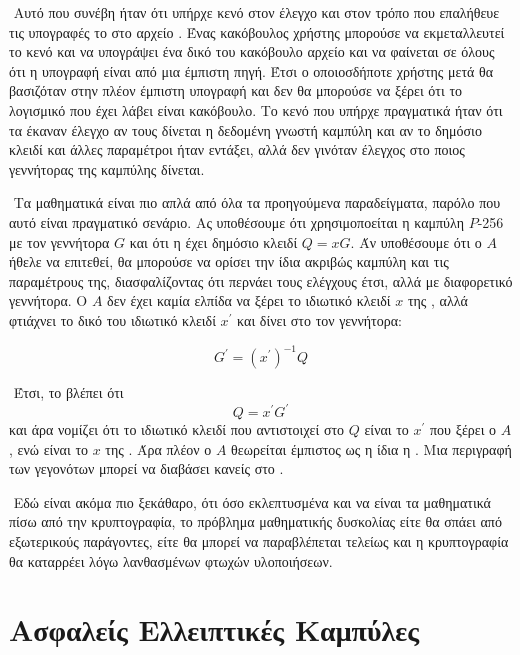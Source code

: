 \documentclass[oneside,a4paper]{article}
\begin{document}
$ $\newline
Αυτό που συνέβη ήταν ότι υπήρχε κενό στον έλεγχο και στον τρόπο που επαλήθευε τις  υπογραφές το  στο αρχείο . Ένας κακόβουλος χρήστης μπορούσε να εκμεταλλευτεί το κενό και να υπογράψει ένα δικό του κακόβουλο αρχείο και να φαίνεται σε όλους ότι η υπογραφή είναι από μια έμπιστη πηγή. Έτσι ο οποιοσδήποτε χρήστης μετά θα βασιζόταν στην πλέον έμπιστη υπογραφή και δεν θα μπορούσε να ξέρει ότι το λογισμικό που έχει λάβει είναι κακόβουλο. Το κενό που υπήρχε πραγματικά ήταν ότι τα  έκαναν έλεγχο αν τους δίνεται η δεδομένη γνωστή καμπύλη και αν το δημόσιο κλειδί και άλλες παραμέτροι ήταν εντάξει, αλλά δεν γινόταν έλεγχος στο ποιος γεννήτορας της καμπύλης δίνεται. 

$ $\newline
Τα μαθηματικά είναι πιο απλά από όλα τα προηγούμενα παραδείγματα, παρόλο που αυτό είναι πραγματικό σενάριο. Ας υποθέσουμε ότι χρησιμοποείται η καμπύλη $P$-256 με τον γεννήτορα $G$ και ότι η  έχει δημόσιο κλειδί $Q = xG$. Άν υποθέσουμε ότι ο $A$ ήθελε να επιτεθεί, θα μπορούσε να ορίσει την ίδια ακριβώς καμπύλη και τις παραμέτρους της, διασφαλίζοντας ότι περνάει τους ελέγχους έτσι, αλλά με διαφορετικό γεννήτορα. Ο $A$ δεν έχει καμία ελπίδα να ξέρει το ιδιωτικό κλειδί $x$ της , αλλά φτιάχνει το δικό του ιδιωτικό κλειδί $x^{\prime}$ και δίνει στο  τον γεννήτορα:

$$G^{\prime} = (x^{\prime})^{-1} Q$$

$ $\newline
Έτσι, το  βλέπει ότι
$$Q = x^{\prime} G^{\prime}$$ και άρα νομίζει ότι το ιδιωτικό κλειδί που αντιστοιχεί στο $Q$ είναι το $x^{\prime}$ που ξέρει ο $A$, ενώ είναι το $x$ της . Άρα πλέον ο $A$ θεωρείται έμπιστος ως η ίδια η . Μια περιγραφή των γεγονότων μπορεί να διαβάσει κανείς στο .


$ $\newline
Εδώ είναι ακόμα πιο ξεκάθαρο, ότι όσο εκλεπτυσμένα και να είναι τα μαθηματικά πίσω από την κρυπτογραφία, το πρόβλημα μαθηματικής δυσκολίας είτε θα σπάει από εξωτερικούς παράγοντες, είτε θα μπορεί να παραβλέπεται τελείως και η κρυπτογραφία θα καταρρέει λόγω λανθασμένων φτωχών υλοποιήσεων.



\pagebreak
\section{Ασφαλείς Ελλειπτικές Καμπύλες}
\end{document}
